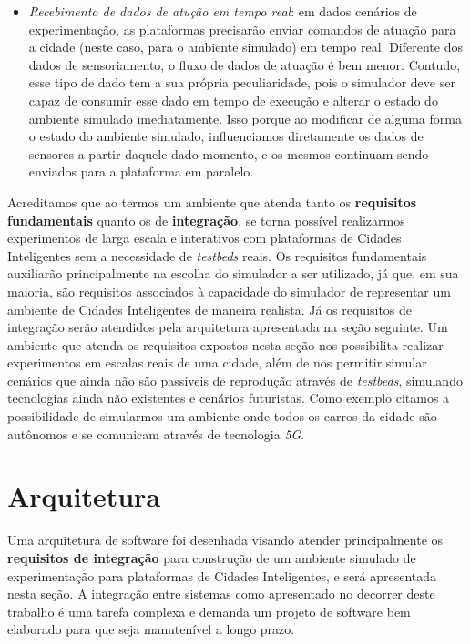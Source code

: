 \begin{itemize}
    \item \textit{Recebimento de dados de atução em tempo real}: em dados cenários de experimentação, as plataformas precisarão enviar comandos de atuação para a cidade (neste caso,
        para o ambiente simulado) em tempo real.
        Diferente dos dados de sensoriamento, o fluxo de dados de atuação é bem menor.
        Contudo, esse tipo de dado tem a sua própria peculiaridade, pois o simulador deve ser capaz de consumir esse dado em tempo de execução e alterar o estado do ambiente simulado
        imediatamente.
        Isso porque ao modificar de alguma forma o estado do ambiente simulado, influenciamos diretamente os dados de sensores a partir daquele dado momento, e os mesmos continuam
        sendo enviados para a plataforma em paralelo.
\end{itemize}

Acreditamos que ao termos um ambiente que atenda tanto os \textbf{requisitos fundamentais} quanto os de \textbf{integração}, se torna possível realizarmos experimentos
de larga escala e interativos com plataformas de Cidades Inteligentes sem a necessidade de \textit{testbeds} reais.
Os requisitos fundamentais auxiliarão principalmente na escolha do simulador a ser utilizado, já que, em sua maioria, são requisitos associados à capacidade do simulador de representar um ambiente
de Cidades Inteligentes de maneira realista.
Já os requisitos de integração serão atendidos pela arquitetura apresentada na seção seguinte.
Um ambiente que atenda os requisitos expostos nesta seção nos possibilita realizar experimentos em escalas reais de uma cidade, além de nos permitir simular cenários que ainda não são passíveis de
reprodução através de \textit{testbeds}, simulando tecnologias ainda não existentes e cenários futuristas.
Como exemplo citamos a possibilidade de simularmos um ambiente onde todos os carros da cidade são autônomos e se comunicam através de tecnologia \textit{5G}.

\section{Arquitetura}

Uma arquitetura de software foi desenhada visando atender principalmente os \textbf{requisitos de integração} para construção de um ambiente simulado de experimentação para plataformas
de Cidades Inteligentes, e será apresentada nesta seção.
A integração entre sistemas como apresentado no decorrer deste trabalho é uma tarefa complexa e demanda um projeto de software bem elaborado para que seja manutenível a longo prazo.


